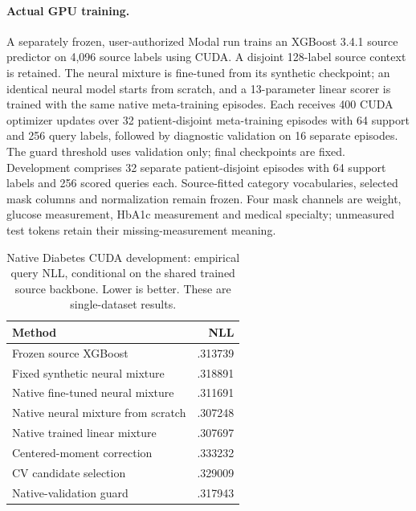 \documentclass[10pt]{article}
\begin{document}
\paragraph{Actual GPU training.}
A separately frozen, user-authorized Modal run trains an XGBoost 3.4.1 source predictor on 4,096 source labels using CUDA. A disjoint 128-label source context is retained. The neural mixture is fine-tuned from its synthetic checkpoint; an identical neural model starts from scratch, and a 13-parameter linear scorer is trained with the same native meta-training episodes. Each receives 400 CUDA optimizer updates over 32 patient-disjoint meta-training episodes with 64 support and 256 query labels, followed by diagnostic validation on 16 separate episodes. The guard threshold uses validation only; final checkpoints are fixed. Development comprises 32 separate patient-disjoint episodes with 64 support labels and 256 scored queries each. Source-fitted category vocabularies, selected mask columns and normalization remain frozen. Four mask channels are weight, glucose measurement, HbA1c measurement and medical specialty; unmeasured test tokens retain their missing-measurement meaning.

\begin{table}[t]
\centering\small
\caption{Native Diabetes CUDA development: empirical query NLL, conditional on the shared trained source backbone. Lower is better. These are single-dataset results.}
\label{tab:native-cuda}
\begin{tabular}{lr}\toprule
Method & NLL\\\midrule
Frozen source XGBoost & .313739\\
Fixed synthetic neural mixture & .318891\\
Native fine-tuned neural mixture & .311691\\
Native neural mixture from scratch & .307248\\
Native trained linear mixture & .307697\\
Centered-moment correction & .333232\\
CV candidate selection & .329009\\
Native-validation guard & .317943\\\bottomrule
\end{tabular}
\end{table}
\end{document}
